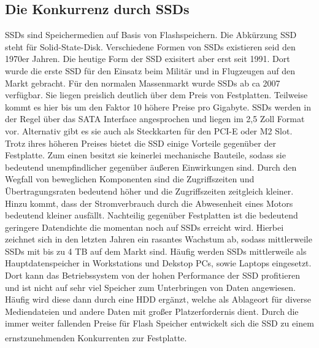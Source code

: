 \documentclass[a4paper, DIV20, 12pt, headsepline, parskip, flushleft]{scrartcl}
\begin{document}
\subsection{Die Konkurrenz durch SSDs}
SSDs sind Speichermedien auf Basis von Flashspeichern. Die Abkürzung SSD steht für Solid-State-Disk. Verschiedene Formen von SSDs existieren seid den 1970er Jahren. Die heutige Form der SSD exisitert aber erst seit 1991. Dort wurde die erste SSD für den Einsatz beim Militär und in Flugzeugen auf den Markt gebracht. Für den normalen Massenmarkt wurde SSDs ab ca 2007 verfügbar. Sie liegen preislich deutlich über dem Preis von Festplatten.  Teilweise kommt es hier bis um den Faktor 10 höhere Preise pro Gigabyte. \newline
SSDs werden in der Regel über das SATA Interface angesprochen und liegen im 2,5 Zoll Format vor. Alternativ gibt es sie auch als Steckkarten für den PCI-E oder M2 Slot. Trotz ihres höheren Preises bietet die SSD einige Vorteile gegenüber der Festplatte. Zum einen besitzt sie keinerlei mechanische Bauteile, sodass sie bedeutend unempfindlicher gegenüber äußeren Einwirkungen sind. Durch den Wegfall von beweglichen Komponenten sind die Zugriffszeiten und Übertragungsraten bedeutend höher und die Zugriffszeiten zeitgleich kleiner. Hinzu kommt, dass der Stromverbrauch durch die Abwesenheit eines Motors bedeutend kleiner ausfällt.\newline
Nachteilig gegenüber Festplatten ist die bedeutend geringere Datendichte die momentan noch auf SSDs erreicht wird. Hierbei zeichnet sich in den letzten Jahren ein rasantes Wachstum ab, sodass mittlerweile SSDs mit bis zu 4 TB auf dem Markt sind. \newline
Häufig werden SSDs mittlerweile als Hauptdatenspeicher in Workstations und Dekstop PCs, sowie Laptops eingesetzt. Dort kann das Betriebssystem von der hohen Performance der SSD profitieren und ist nicht auf sehr viel Speicher zum Unterbringen von Daten angewiesen. Häufig wird diese dann durch eine HDD ergänzt, welche als Ablageort für diverse Mediendateien und andere Daten mit großer Platzerfordernis dient.\newline
Durch die immer weiter fallenden Preise für Flash Speicher entwickelt sich die SSD zu einem ernstzunehmenden Konkurrenten zur Festplatte. \textsuperscript{\cite{ssd}}
\end{document}
